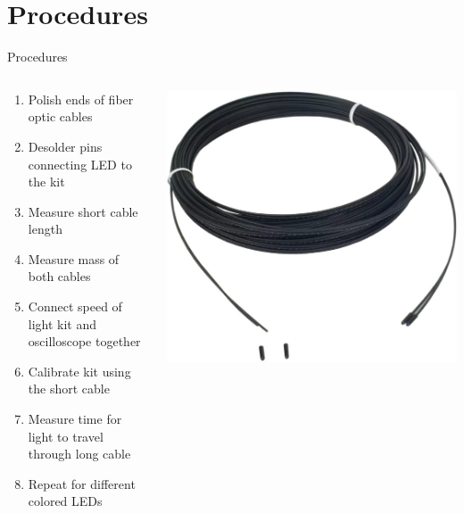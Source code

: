 \documentclass{beamer}
\begin{document}
\section{Procedures}
\begin{frame}{Procedures}
  \begin{columns}
    \begin{column}{0.6\textwidth}
      \begin{enumerate}
        \item Polish ends of fiber optic cables
        \item Desolder pins connecting LED to the kit
        \item Measure short cable length
        \item Measure mass of both cables
        \item Connect speed of light kit and oscilloscope together
        \item Calibrate kit using the short cable
        \item Measure time for light to travel through long cable
        \item Repeat for different colored LEDs
      \end{enumerate}
    \end{column}

    \begin{column}{0.4\textwidth}
      \includegraphics[width=\textwidth]{fiber-optic-cable.jpg}
    \end{column}
  \end{columns}
\end{frame}
\end{document}
